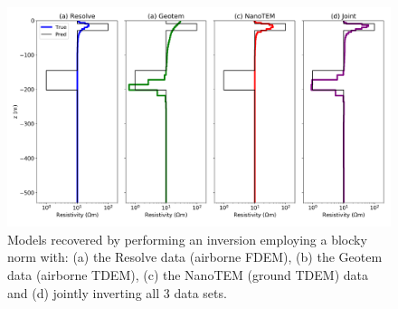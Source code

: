 \begin{figure}
    \begin{center}
    \includegraphics[width=0.8\columnwidth]{figures/blocky-inversion.png}
    \end{center}
\caption{
    Models recovered by performing an inversion employing a blocky norm with:
    (a) the Resolve data (airborne FDEM), (b) the Geotem data (airborne TDEM), (c) the NanoTEM (ground TDEM) data and (d) jointly inverting all 3 data sets.
}
\label{fig:blocky-inversion}
\end{figure}

